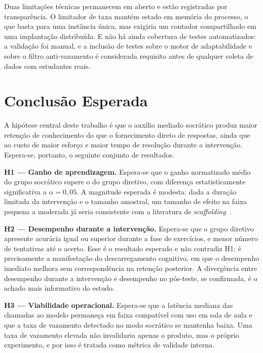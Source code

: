 \documentclass[10pt, a4paper, twocolumn]{article}
\begin{document}
Duas limitações técnicas permanecem em aberto e estão registradas por
transparência. O limitador de taxa mantém estado em memória do processo, o que
basta para uma instância única, mas exigiria um contador compartilhado em uma
implantação distribuída. E não há ainda cobertura de testes automatizados: a
validação foi manual, e a inclusão de testes sobre o motor de adaptabilidade e
sobre o filtro anti-vazamento é considerada requisito antes de qualquer coleta
de dados com estudantes reais.

\section{Conclusão Esperada}
\label{sec:conclusao}

A hipótese central deste trabalho é que o auxílio mediado socrático produz maior
retenção de conhecimento do que o fornecimento direto de respostas, ainda que ao
custo de maior esforço e maior tempo de resolução durante a intervenção. Espera-se,
portanto, o seguinte conjunto de resultados.

\textbf{H1 --- Ganho de aprendizagem.} Espera-se que o ganho normatizado médio do
grupo socrático supere o do grupo diretivo, com diferença estatisticamente
significativa a $\alpha = 0{,}05$. A magnitude esperada é modesta: dada a duração
limitada da intervenção e o tamanho amostral, um tamanho de efeito na faixa
pequena a moderada já seria consistente com a literatura de
\textit{scaffolding}~\cite{kestin2025,ocen2026}.

\textbf{H2 --- Desempenho durante a intervenção.} Espera-se que o grupo diretivo
apresente acurácia igual ou superior durante a fase de exercícios, e menor número
de tentativas até o acerto. Esse é o resultado esperado e não contradiz H1: é
precisamente a manifestação do descarregamento cognitivo, em que o desempenho
imediato melhora sem correspondência na retenção posterior. A divergência entre
desempenho durante a intervenção e desempenho no pós-teste, se confirmada, é o
achado mais informativo do estudo.

\textbf{H3 --- Viabilidade operacional.} Espera-se que a latência mediana das
chamadas ao modelo permaneça em faixa compatível com uso em sala de aula e que a
taxa de vazamento detectado no modo socrático se mantenha baixa. Uma taxa de
vazamento elevada não invalidaria apenas o produto, mas o próprio experimento, e
por isso é tratada como métrica de validade interna.
\end{document}
